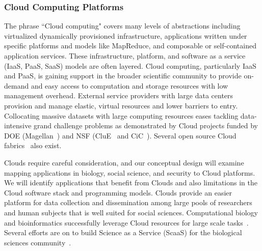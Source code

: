 \subsubsection{Cloud Computing Platforms}
The phrase ``Cloud computing" covers many levels of abstractions including virtualized dynamically
provisioned infrastructure, applications written under specific platforms and models like MapReduce,
and composable or self-contained application services. 
These infrastructure, platform, and software
as a service (IaaS, PaaS, SaaS) models are often layered. 
Cloud computing, particularly IaaS and
PaaS, is gaining support in the broader scientific community to provide on-demand and easy access
to computation and storage resources with low management overhead. 
External service providers with large data centers provision and manage elastic, 
virtual resources and lower barriers to entry.
Collocating massive datasets with large computing resources eases tackling
data-intensive grand challenge problems as demonstrated by Cloud projects
funded by DOE (Magellan~\cite{magellan}) and NSF (CluE~\cite{CluE} and
CiC~\cite{CiC}). 
Several open source Cloud fabrics~\cite{Euca, Nimbus} also exist.

Clouds require careful consideration, and our conceptual design will examine mapping applications
in biology, social science, and security to Cloud platforms. 
We will identify applications
that benefit from Clouds and also limitations in the Cloud software stack and programming models.
Clouds provide an easier platform for data collection and dissemination among large
pools of researchers and human subjects that is well suited for social sciences.
Computational biology and bioinformatics successfully leverage Cloud resources for
large scale tasks~\cite{langmead:Cloudsnp:2009, lu:azureblast:2010}.
Several efforts are on to build Science as a Service (ScaaS) for the biological
sciences community~\cite{carmen,myexperiment,Afgan2011}.

